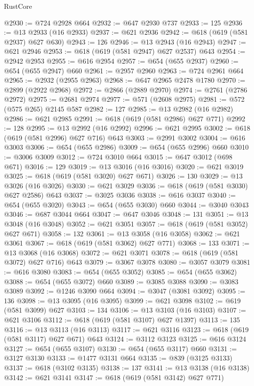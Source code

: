 \begin{lexlean}{RustCore}
\begin{coremodule}
@2930 := @724 @2928 @664
@2932 := @647 @2930 @737
@2933 := 125
@2936 := @13 @2933 (@16 @2933)
@2937 := @621 @2936
@2942 := @618 (@619 (@581 @2937) @627 @630)
@2943 := 126
@2946 := @13 @2943 (@16 @2943)
@2947 := @621 @2946
@2953 := @618 (@619 (@581 @2947) @627 @2537) @643
@2954 := @2942 @2953
@2955 := @616 @2954
@2957 := @654 (@655 @2937)
@2960 := @654 (@655 @2947) @660
@2961 := @2957 @2960
@2963 := @724 @2961 @664
@2965 := @2932 (@2955 @2963)
@2968 := @647 @2965 @2478 @1780
@2970 := @2899 (@2922 @2968)
@2972 := @2866 (@2889 @2970)
@2974 := @2761 (@2786 @2972)
@2975 := @2681 @2974
@2977 := @571 (@2608 @2975)
@2981 := @572 (@575 @265) @2145 @587
@2982 := 127
@2985 := @13 @2982 (@16 @2982)
@2986 := @621 @2985
@2991 := @618 (@619 (@581 @2986) @627 @771)
@2992 := 128
@2995 := @13 @2992 (@16 @2992)
@2996 := @621 @2995
@3002 := @618 (@619 (@581 @2996) @627 @716) @643
@3003 := @2991 @3002
@3004 := @616 @3003
@3006 := @654 (@655 @2986)
@3009 := @654 (@655 @2996) @660
@3010 := @3006 @3009
@3012 := @724 @3010 @664
@3015 := @647 @3012 (@698 @671)
@3016 := 129
@3019 := @13 @3016 (@16 @3016)
@3020 := @621 @3019
@3025 := @618 (@619 (@581 @3020) @627 @671)
@3026 := 130
@3029 := @13 @3026 (@16 @3026)
@3030 := @621 @3029
@3036 := @618 (@619 (@581 @3030) @627 @2586) @643
@3037 := @3025 @3036
@3038 := @616 @3037
@3040 := @654 (@655 @3020)
@3043 := @654 (@655 @3030) @660
@3044 := @3040 @3043
@3046 := @687 @3044 @664
@3047 := @647 @3046
@3048 := 131
@3051 := @13 @3048 (@16 @3048)
@3052 := @621 @3051
@3057 := @618 (@619 (@581 @3052) @627 @671)
@3058 := 132
@3061 := @13 @3058 (@16 @3058)
@3062 := @621 @3061
@3067 := @618 (@619 (@581 @3062) @627 @771)
@3068 := 133
@3071 := @13 @3068 (@16 @3068)
@3072 := @621 @3071
@3078 := @618 (@619 (@581 @3072) @627 @716) @643
@3079 := @3067 @3078
@3080 := @3057 @3079
@3081 := @616 @3080
@3083 := @654 (@655 @3052)
@3085 := @654 (@655 @3062)
@3088 := @654 (@655 @3072) @660
@3089 := @3085 @3088
@3090 := @3083 @3089
@3092 := @1246 @3090 @664
@3094 := @3047 (@3081 @3092)
@3095 := 136
@3098 := @13 @3095 (@16 @3095)
@3099 := @621 @3098
@3102 := @619 (@581 @3099) @627
@3103 := 134
@3106 := @13 @3103 (@16 @3103)
@3107 := @621 @3106
@3112 := @618 (@619 (@581 @3107) @627 @1397)
@3113 := 135
@3116 := @13 @3113 (@16 @3113)
@3117 := @621 @3116
@3123 := @618 (@619 (@581 @3117) @627 @671) @643
@3124 := @3112 @3123
@3125 := @616 @3124
@3127 := @654 (@655 @3107)
@3130 := @654 (@655 @3117) @660
@3131 := @3127 @3130
@3133 := @1477 @3131 @664
@3135 := @839 (@3125 @3133)
@3137 := @618 (@3102 @3135)
@3138 := 137
@3141 := @13 @3138 (@16 @3138)
@3142 := @621 @3141
@3147 := @618 (@619 (@581 @3142) @627 @771)

\end{coremodule}
\end{lexlean}

